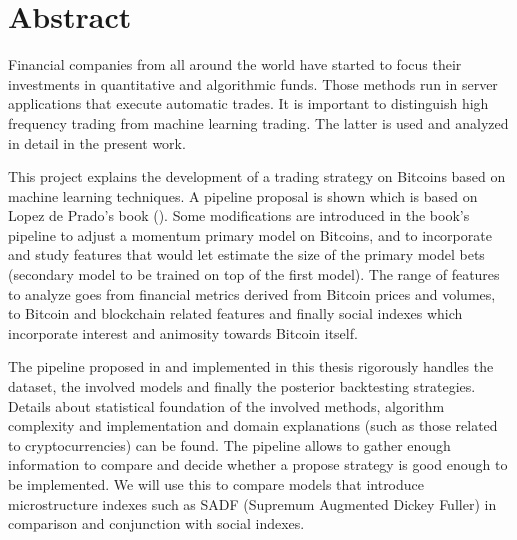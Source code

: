 \section{Abstract}
\label{sec:abstract_en}

Financial companies from all around the world have started to focus their investments in quantitative and algorithmic funds. Those methods run in server applications that execute automatic trades. It is important to distinguish high frequency trading from machine learning trading. The latter is used and analyzed in detail in the present work.

This project explains the development of a trading strategy on Bitcoins based on machine learning techniques. A pipeline proposal is shown which is based on Lopez de Prado's book (\cite{lopez_de_prado}). Some modifications are introduced in the book's pipeline to adjust a momentum primary model on Bitcoins, and to incorporate and study features that would let estimate the size of the primary model bets (secondary model to be trained on top of the first model). The range of features to analyze goes from financial metrics derived from Bitcoin prices and volumes, to Bitcoin and blockchain related features and finally social indexes which incorporate interest and animosity towards Bitcoin itself.

The pipeline proposed in \cite{lopez_de_prado} and implemented in this thesis rigorously handles the dataset, the involved models and finally the posterior backtesting strategies. Details about statistical foundation of the involved methods, algorithm complexity and implementation and domain explanations (such as those related to cryptocurrencies) can be found. The pipeline allows to gather enough information to compare and decide whether a propose strategy is good enough to be implemented. We will use this to compare models that introduce microstructure indexes such as SADF (Supremum Augmented Dickey Fuller) in comparison and conjunction with social indexes.


